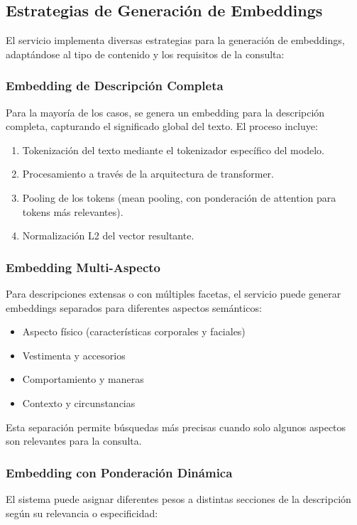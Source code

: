 \documentclass[12pt,a4paper]{article}
\begin{document}
\subsection{Estrategias de Generación de Embeddings}
\label{subsec:es-estrategias}

El servicio implementa diversas estrategias para la generación de embeddings, adaptándose al tipo de contenido y los requisitos de la consulta:

\subsubsection{Embedding de Descripción Completa}
Para la mayoría de los casos, se genera un embedding para la descripción completa, capturando el significado global del texto. El proceso incluye:

\begin{enumerate}
    \item Tokenización del texto mediante el tokenizador específico del modelo.
    \item Procesamiento a través de la arquitectura de transformer.
    \item Pooling de los tokens (mean pooling, con ponderación de attention para tokens más relevantes).
    \item Normalización L2 del vector resultante.
\end{enumerate}

\subsubsection{Embedding Multi-Aspecto}
Para descripciones extensas o con múltiples facetas, el servicio puede generar embeddings separados para diferentes aspectos semánticos:

\begin{itemize}
    \item Aspecto físico (características corporales y faciales)
    \item Vestimenta y accesorios
    \item Comportamiento y maneras
    \item Contexto y circunstancias
\end{itemize}

Esta separación permite búsquedas más precisas cuando solo algunos aspectos son relevantes para la consulta.

\subsubsection{Embedding con Ponderación Dinámica}
El sistema puede asignar diferentes pesos a distintas secciones de la descripción según su relevancia o especificidad:
\end{document}
